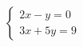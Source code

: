 $\displaystyle
\left\{
\begin{array}{l}
\displaystyle 2x - y = 0 \\
\displaystyle 3x+5y = 9
\end{array}
\right.
$
